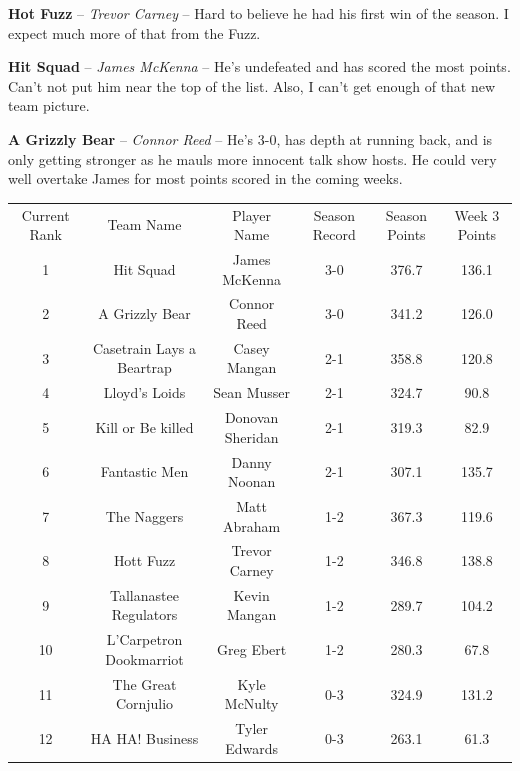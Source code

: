 \documentclass[11pt,letterpaper]{article}
\begin{document}
\begin{etaremune}
\item \textbf{Hot Fuzz} -- \textit{Trevor Carney} -- Hard to believe he had his first win of the season. I expect much more of that from the Fuzz. 
\item \textbf{Hit Squad} -- \textit{James McKenna} -- He's undefeated and has scored the most points. Can't not put him near the top of the list. Also, I can't get enough of that new team picture. 
\item \textbf{A Grizzly Bear} -- \textit{Connor Reed} -- He's 3-0, has depth at running back, and is only getting stronger as he mauls more innocent talk show hosts. He could very well overtake James for most points scored in the coming weeks.
\end{etaremune}



\newpage
{}
\vspace{-25pt}
\begin{table} [h]
\footnotesize
\begin{center}
\begin{tabular} { c c c c c c }
\\[3mm] Current Rank & Team Name & Player Name & Season Record &  Season Points & Week 3 Points
\\[3mm] 1 & Hit Squad & James McKenna & 3-0 & 376.7 & 136.1
\\ 2 & A Grizzly Bear & Connor Reed & 3-0 & 341.2 & 126.0
\\ 3 & Casetrain Lays a Beartrap & Casey Mangan & 2-1 & 358.8 & 120.8
\\ 4 & Lloyd's Loids & Sean Musser & 2-1 & 324.7 & 90.8
\\ 5 & Kill or Be killed & Donovan Sheridan & 2-1 & 319.3 & 82.9
\\ 6 & Fantastic Men & Danny Noonan & 2-1 & 307.1 & 135.7
\\ 7 & The Naggers & Matt Abraham & 1-2 & 367.3 & 119.6
\\ 8 & Hott Fuzz & Trevor Carney & 1-2 & 346.8 & 138.8
\\ 9 & Tallanastee Regulators & Kevin Mangan & 1-2 & 289.7 & 104.2
\\ 10 & L'Carpetron Dookmarriot & Greg Ebert & 1-2 & 280.3 & 67.8
\\ 11 & The Great Cornjulio & Kyle McNulty & 0-3 & 324.9 & 131.2
\\ 12 & HA HA! Business & Tyler Edwards & 0-3 & 263.1 & 61.3
\end{tabular}
\end{center}
\end{table}
\end{document}
